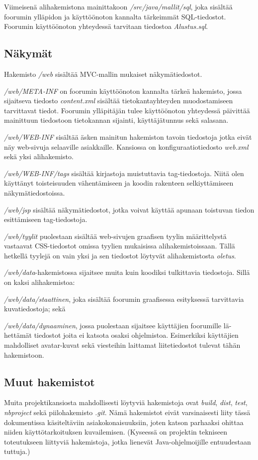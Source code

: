 \documentclass[11pt]{article}
\begin{document}
			Viimeisenä alihakemistona mainittakoon \emph{/src/java/mallit/sql}, joka sisältää foorumin
			ylläpidon ja käyttöönoton kannalta tärkeimmät SQL-tiedostot. Foorumin käyttöönoton yhteydessä
			tarvitaan tiedostoa \emph{Alustus.sql}.
			
		\newpage
		\thispagestyle{plain}
		\subsection{Näkymät}
			Hakemisto \emph{/web} sisältää MVC-mallin mukaiset näkymätiedostot.
			
			\emph{/web/META-INF} on foorumin käyttöönoton kannalta tärkeä hakemisto, jossa sijaitseva 
			tiedosto \emph{content.xml} sisältää tietokantayhteyden muodostamiseen tarvittavat tiedot.
			Foorumin ylläpitäjän tulee käyttöönoton yhteydessä päivittää mainittuun tiedostoon tietokannan
			sijainti, käyttäjätunnus sekä salasana.
			
			\emph{/web/WEB-INF} sisältää äsken mainitun hakemiston tavoin tiedostoja jotka eivät näy
			web-sivuja selaaville asiakkaille. Kansiossa on konfiguraatiotiedosto \emph{web.xml} sekä yksi
			alihakemisto.
			
			\emph{/web/WEB-INF/tags} sisältää kirjastoja muistuttavia tag-tiedostoja. Niitä olen
			käyttänyt toisteisuuden vähentämiseen ja koodin rakenteen selkiyttämiseen näkymätiedostoissa.
			
			\emph{/web/jsp} sisältää näkymätiedostot, jotka voivat käyttää apunaan toistuvan tiedon
			esittämiseen tag-tiedostoja.
			
			\emph{/web/tyylit} puolestaan sisältää web-sivujen graafisen tyylin määrittelystä vastaavat
			CSS-tiedostot omissa tyylien mukaisissa alihakemistoissaan. Tällä hetkellä tyylejä on vain yksi
			ja sen tiedostot löytyvät alihakemistosta \emph{oletus}.
			
			\emph{/web/data}-hakemistossa sijaitsee muita kuin koodiksi tulkittavia tiedostoja. Sillä on
			kaksi alihakemistoa:
			
			\emph{/web/data/staattinen}, joka sisältää foorumin graafisessa esityksessä tarvittavia
			kuvatiedostoja; sekä
			
			\emph{/web/data/dynaaminen}, jossa puolestaan sijaitsee käyttäjien foorumille lä-hettämät
			tiedostot joita ei katsota osaksi ohjelmistoa. Esimerkiksi käyttäjien mahdolliset avatar-kuvat
			sekä viesteihin laittamat liitetiedostot tulevat tähän hakemistoon.
			
		\subsection{Muut hakemistot}
			Muita projektikansiosta mahdollisesti löytyviä hakemistoja ovat \emph{build}, \emph{dist},
			\emph{test}, \emph{nbproject} sekä piilohakemisto \emph{.git}. Nämä hakemistot eivät 
			varsinaisesti liity tässä dokumentissa käsiteltäviin asiakokonaisuuksiin, joten katson 
			parhaaksi ohittaa niiden käyttötarkoituksen kuvailemisen. (Kyseessä on projektin tekniseen
			toteutukseen liittyviä hakemistoja, jotka lienevät Java-ohjelmoijille entuudestaan tuttuja.)
			
\end{document}
